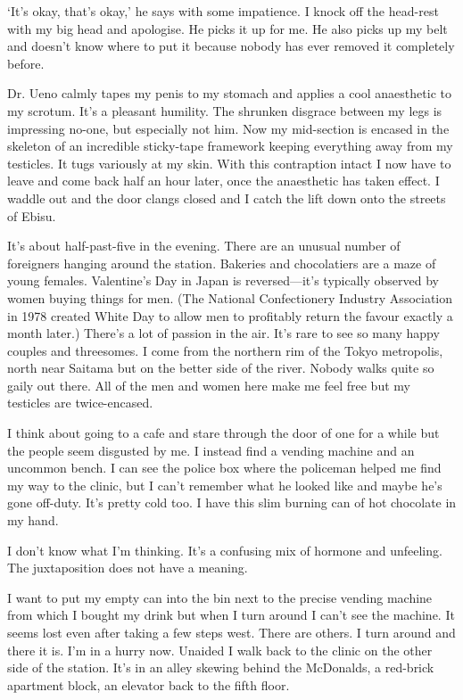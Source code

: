 \documentclass[12pt,a4paper,onecolumn]{letter}
\begin{document}
`It's okay, that's okay,' he says with some impatience. I knock off the head-rest with my big head and apologise. He picks it up for me. He also picks up my belt and doesn't know where to put it because nobody has ever removed it completely before.

Dr. Ueno calmly tapes my penis to my stomach and applies a cool anaesthetic to my scrotum. It's a pleasant humility. The shrunken disgrace between my legs is impressing no-one, but especially not him. Now my mid-section is encased in the skeleton of an incredible sticky-tape framework keeping everything away from my testicles. It tugs variously at my skin. With this contraption intact I now have to leave and come back half an hour later, once the anaesthetic has taken effect. I waddle out and the door clangs closed and I catch the lift down onto the streets of Ebisu.

It's about half-past-five in the evening. There are an unusual number of foreigners hanging around the station. Bakeries and chocolatiers are a maze of young females. Valentine's Day in Japan is reversed---it's typically observed by women buying things for men. (The National Confectionery Industry Association in 1978 created White Day to allow men to profitably return the favour exactly a month later.) There's a lot of passion in the air. It's rare to see so many happy couples and threesomes. I come from the northern rim of the Tokyo metropolis, north near Saitama but on the better side of the river. Nobody walks quite so gaily out there. All of the men and women here make me feel free but my testicles are twice-encased.

I think about going to a cafe and stare through the door of one for a while but the people seem disgusted by me. I instead find a vending machine and an uncommon bench. I can see the police box where the policeman helped me find my way to the clinic, but I can't remember what he looked like and maybe he's gone off-duty. It's pretty cold too. I have this slim burning can of hot chocolate in my hand.

I don't know what I'm thinking. It's a confusing mix of hormone and unfeeling. The juxtaposition does not have a meaning.

I want to put my empty can into the bin next to the precise vending machine from which I bought my drink but when I turn around I can't see the machine. It seems lost even after taking a few steps west. There are others. I turn around and there it is. I'm in a hurry now. Unaided I walk back to the clinic on the other side of the station. It's in an alley skewing behind the McDonalds, a red-brick apartment block, an elevator back to the fifth floor.
\end{document}
